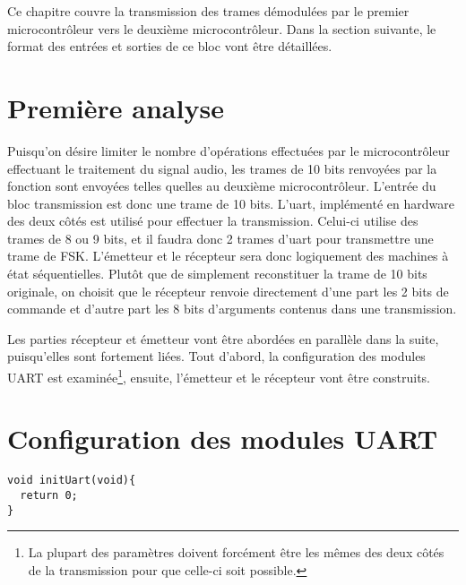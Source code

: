 Ce chapitre couvre la transmission des trames démodulées par le premier microcontrôleur vers le deuxième microcontrôleur. Dans la section suivante, le format des entrées et sorties de ce bloc vont être détaillées.

\section{Première analyse}
Puisqu'on désire limiter le nombre d'opérations effectuées par le microcontrôleur effectuant le traitement du signal audio, les trames de 10 bits renvoyées par la fonction  sont envoyées telles quelles au deuxième microcontrôleur. L'entrée du bloc transmission est donc une trame de 10 bits. L'uart, implémenté en hardware des deux côtés est utilisé pour effectuer la transmission. Celui-ci utilise des trames de 8 ou 9 bits, et il faudra donc 2 trames d'uart pour transmettre une trame de FSK. L'émetteur et le récepteur sera donc logiquement des machines à état séquentielles. Plutôt que de simplement reconstituer la trame de 10 bits originale, on choisit que le récepteur renvoie directement d'une part les 2 bits de commande et d'autre part les 8 bits d'arguments contenus dans une transmission.

Les parties récepteur et émetteur vont être abordées en parallèle dans la suite, puisqu'elles sont fortement liées. Tout d'abord, la configuration des modules UART est examinée\footnote{La plupart des paramètres doivent forcément être les mêmes des deux côtés de la transmission pour que celle-ci soit possible.}, ensuite, l'émetteur et le récepteur vont être construits.

\section{Configuration des modules UART}

\begin{verbatim}
void initUart(void){    
  return 0;
}
\end{verbatim}

